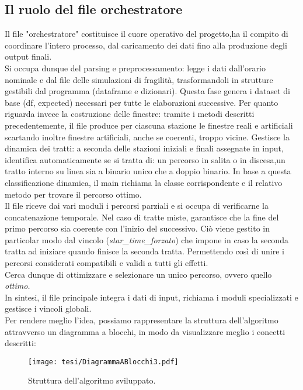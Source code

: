 \documentclass{report}
\begin{document}
   


\subsection{Il ruolo del file orchestratore}
Il file "orchestratore" costituisce il cuore operativo del progetto,ha il compito di coordinare l’intero processo, dal caricamento dei dati fino alla produzione degli output finali. \\ Si occupa dunque del parsing e preprocessamento: legge i dati dall’orario nominale e dal file delle simulazioni di fragilità, trasformandoli in strutture gestibili dal programma (dataframe e dizionari). Questa fase genera i dataset di base (df, expected) necessari per tutte le elaborazioni successive. Per quanto riguarda invece la costruzione delle finestre: tramite i metodi descritti precedentemente, il file produce per ciascuna stazione le finestre reali e artificiali scartando inoltre finestre artificiali, anche se coerenti, troppo vicine. Gestisce la dinamica dei tratti: a seconda delle stazioni iniziali e finali assegnate in input, identifica automaticamente se si tratta di: un percorso in salita o in discesa,un tratto interno su linea sia a binario unico che a doppio binario. In base a questa classificazione dinamica, il main richiama la classe corrispondente e il relativo metodo per trovare il percorso ottimo. \\ Il file riceve dai vari moduli i percorsi parziali e si occupa di verificarne la concatenazione temporale. Nel caso di tratte miste, garantisce che la fine del primo percorso sia coerente con l’inizio del successivo. Ciò viene gestito in particolar modo dal vincolo (\textit{star\_time\_forzato}) che impone in caso la seconda tratta ad iniziare quando finisce la seconda tratta. Permettendo così di unire i percorsi considerati compatibili e validi a tutti gli effetti. \\  Cerca dunque di ottimizzare e selezionare un unico percorso, ovvero quello \textit{ottimo.} \\ In sintesi, il file principale integra i dati di input, richiama i moduli specializzati e gestisce i vincoli globali. \\ Per rendere meglio l'idea, possiamo rappresentare la struttura dell'algoritmo attravverso un diagramma a blocchi, in modo da visualizzare meglio i concetti descritti: 

\begin{figure}[H]  %
  \centering
  \caption{Struttura dell'algoritmo sviluppato.}
  \texttt{[image: tesi/DiagrammaABlocchi3.pdf]}
  \label{fig:placeholder}
\end{figure}
\end{document}
